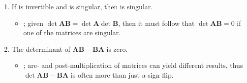 \begin{itemize}
\begin{enumerate}
{\begin{enumerate}
        \item If  is invertible and  is singular, then 
          is singular.
          \begin{itemize}\color{foreground}
            \item {}; given \(\det{\bm{AB}} = \det{\bm{A}}
              \det{\bm{B}} \), then it must follow that \(\det{\bm{AB}= 0} \)
              if one of the matrices are singular.
          \end{itemize}

        \item The determinant of \(\bm{AB} - \bm{BA} \) is zero.
          \begin{itemize}\color{foreground}
            \item {}; are- and post-multiplication of matrices can yield
              different results, thus \(\det{\bm{AB - BA}}\) is often more than
              just a sign flip.
          \end{itemize}

      \end{enumerate}
    }
  \end{enumerate}

\end{itemize}

